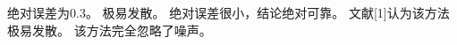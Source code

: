 \documentclass{ctexbook}
\begin{document}
绝对误差为0.3。
极易发散。
绝对误差很小，结论绝对可靠。
文献[1]认为该方法极易发散。
该方法完全忽略了噪声。
\end{document}
